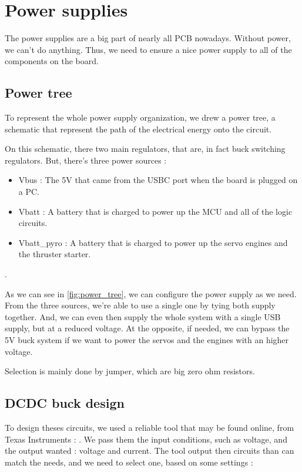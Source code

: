 \section{Power supplies}
The power supplies are a big part of nearly all PCB nowadays. Without power, we can't do 
anything. Thus, we need to ensure a nice power supply to all of the components on the board.

\subsection{Power tree}
To represent the whole power supply organization, we drew a power tree, a schematic that
represent the path of the electrical energy onto the circuit.



On this schematic, there two main regulators, that are, in fact buck switching regulators.
But, there's three power sources :
\begin{itemize}[noitemsep]
    \item   Vbus : The 5V that came from the USBC port when the board is plugged on a PC.
    \item   Vbatt : A battery that is charged to power up the MCU and all of the logic
          circuits.
    \item   Vbatt\_pyro : A battery that is charged to power up the servo engines and
          the thruster starter.
\end{itemize}.

As we can see in \ref{fig:power_tree}, we can configure the power supply as we need.
From the three sources, we're able to use a single one by tying both supply together.
And, we can even then supply the whole system with a single USB supply, but at a reduced
voltage. At the opposite, if needed, we can bypass the 5V buck system if we want to
power the servos and the engines with an higher voltage.

Selection is mainly done by jumper, which are big zero ohm resistors.

\subsection{DCDC buck design}
To design theses circuits, we used a reliable tool that may be found online, from
Texas Instruments : \cite{POWERDESIGNER}. We pass them the input conditions, such as
voltage, and the output wanted : voltage and current. The tool output then circuits
than can match the needs, and we need to select one, based on some settings :


